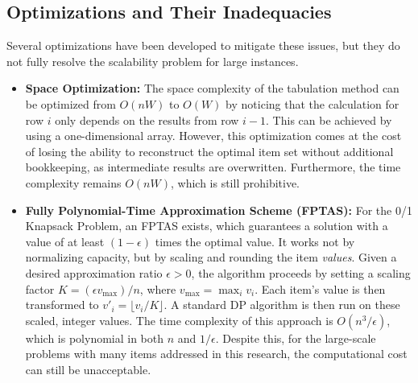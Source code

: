\subsection{Optimizations and Their Inadequacies}

Several optimizations have been developed to mitigate these issues, but they do not fully resolve the scalability problem for large instances.

\begin{itemize}
    \item \textbf{Space Optimization:} The space complexity of the tabulation method can be optimized from \(O(nW)\) to \(O(W)\) by noticing that the calculation for row \(i\) only depends on the results from row \(i-1\). This can be achieved by using a one-dimensional array. However, this optimization comes at the cost of losing the ability to reconstruct the optimal item set without additional bookkeeping, as intermediate results are overwritten. Furthermore, the time complexity remains \(O(nW)\), which is still prohibitive.

    \item \textbf{Fully Polynomial-Time Approximation Scheme (FPTAS):} For the 0/1 Knapsack Problem, an FPTAS exists, which guarantees a solution with a value of at least \((1-\epsilon)\) times the optimal value. It works not by normalizing capacity, but by scaling and rounding the item \textit{values}. Given a desired approximation ratio \(\epsilon > 0\), the algorithm proceeds by setting a scaling factor \(K = (\epsilon v_{\max}) / n\), where \(v_{\max} = \max_{i} v_i\). Each item's value is then transformed to \(v'_i = \lfloor v_i / K \rfloor\). A standard DP algorithm is then run on these scaled, integer values. The time complexity of this approach is \(O(n^3/\epsilon)\), which is polynomial in both \(n\) and \(1/\epsilon\). Despite this, for the large-scale problems with many items addressed in this research, the computational cost can still be unacceptable.
\end{itemize}


